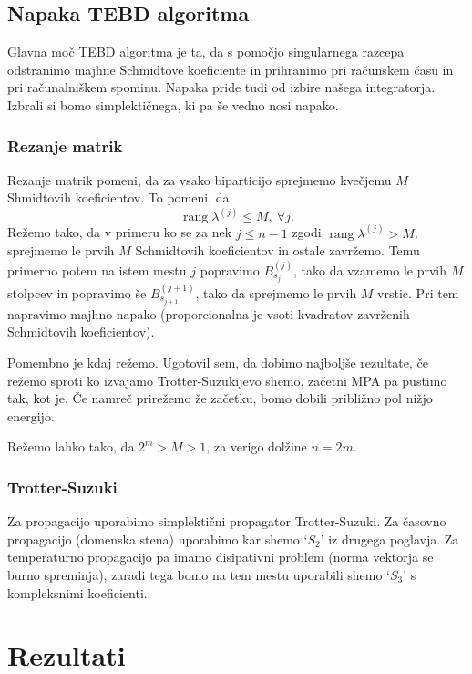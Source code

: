 \documentclass[12pt, a4 paper]{article}
\newcommand{\rang}{
	\operatorname{rang}
}
\begin{document}
\subsection{Napaka TEBD algoritma}

Glavna mo\v c TEBD algoritma je ta, da s pomo\v cjo singularnega razcepa odstranimo majhne Schmidtove koeficiente in
prihranimo pri ra\v cunskem \v casu in pri ra\v cunalni\v skem spominu. Napaka pride tudi od izbire na\v sega integratorja.
Izbrali si bomo simplekti\v cnega, ki pa \v se vedno nosi napako.

\subsubsection{Rezanje matrik}

Rezanje matrik pomeni, da za vsako biparticijo sprejmemo kve\v cjemu $M$ Shmidtovih koeficientov. To pomeni, da
\[
	\rang\lambda^{(j)} \leq M,\ \forall j.
\]
Re\v zemo tako, da v primeru ko se za nek $j \leq n-1$ zgodi  $\rang\lambda^{(j)} > M$, sprejmemo le prvih $M$ Schmidtovih
koeficientov in ostale zavr\v zemo. Temu primerno potem na istem mestu $j$ popravimo $B^{(j)}_{s_j}$, tako da vzamemo le
prvih $M$ stolpcev in popravimo \v se $B^{(j+1)}_{s_{j+1}}$, tako da sprejmemo le prvih $M$ vrstic. Pri tem napravimo majhno
napako (proporcionalna je vsoti kvadratov zavr\v zenih Schmidtovih koeficientov).

Pomembno je kdaj re\v zemo. Ugotovil sem, da dobimo najbolj\v se rezultate, \v ce re\v zemo sproti ko izvajamo
Trotter-Suzukijevo shemo, za\v cetni MPA pa pustimo tak, kot je. \v Ce namre\v c prire\v zemo \v ze za\v cetku, bomo dobili
pribli\v zno pol ni\v zjo energijo.

Re\v zemo lahko tako, da $2^m > M > 1$, za verigo dol\v zine $n = 2m$.

\subsubsection{Trotter-Suzuki}

Za propagacijo uporabimo simplekti\v cni propagator Trotter-Suzuki. Za \v casovno propagacijo (domenska stena) uporabimo kar
shemo `$S_2$' iz drugega poglavja. Za temperaturno propagacijo pa imamo disipativni problem (norma vektorja se burno
spreminja), zaradi tega bomo na tem mestu uporabili shemo `$S_3$' s kompleksnimi koeficienti.

\section{Rezultati}
\end{document}
